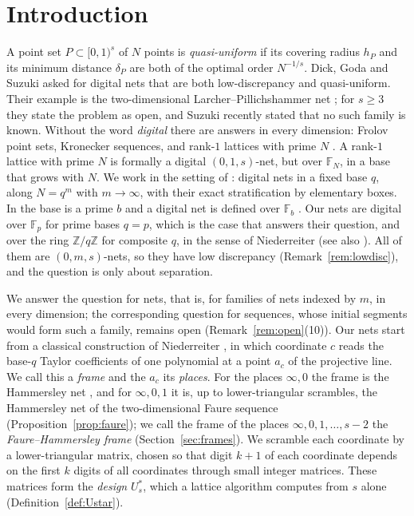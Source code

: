 \documentclass[11pt]{amsart}
\theoremstyle{definition}
\theoremstyle{plain}
\newcommand{\Z}{\mathbb{Z}}
\newcommand{\F}{\mathbb{F}}
\begin{document}
\maketitle
\enlargethispage{6pt}

\section{Introduction}\label{sec:intro}
A point set $P\subset[0,1)^s$ of $N$ points is \emph{quasi-uniform} if its covering radius $h_P$ and its minimum distance $\delta_P$ are both of the optimal order $N^{-1/s}$. Dick, Goda and Suzuki \cite{DGS2} asked for digital nets that are both low-discrepancy and quasi-uniform. Their example is the two-dimensional Larcher--Pillichshammer net \cite{LP01}; for $s\ge3$ they state the problem as open, and Suzuki \cite{Suz26} recently stated that no such family is known. Without the word \emph{digital} there are answers in every dimension: Frolov point sets, Kronecker sequences, and rank-$1$ lattices with prime $N$ \cite[Thms.~3.1, 3.9, 3.7]{DGLPS1}. A rank-$1$ lattice with prime $N$ is formally a digital $(0,1,s)$-net, but over $\F_N$, in a base that grows with $N$. We work in the setting of \cite{DGS2,Suz26}: digital nets in a fixed base $q$, along $N=q^m$ with $m\to\infty$, with their exact stratification by elementary boxes. In \cite{DGS2} the base is a prime $b$ and a digital net is defined over $\F_b$ \cite[Def.~2.1]{DGS2}. Our nets are digital over $\F_p$ for prime bases $q=p$, which is the case that answers their question, and over the ring $\Z/q\Z$ for composite $q$, in the sense of Niederreiter \cite{Nie87} (see also \cite{LNS96}). All of them are $(0,m,s)$-nets, so they have low discrepancy (Remark~\ref{rem:lowdisc}), and the question is only about separation.

We answer the question for nets, that is, for families of nets indexed by $m$, in every dimension; the corresponding question for sequences, whose initial segments would form such a family, remains open (Remark~\ref{rem:open}(10)). Our nets start from a classical construction of Niederreiter \cite[Sec.~6]{Nie87}, in which coordinate $c$ reads the base-$q$ Taylor coefficients of one polynomial at a point $a_c$ of the projective line. We call this a \emph{frame} and the $a_c$ its \emph{places}. For the places $\infty,0$ the frame is the Hammersley net \cite{Ham60}, and for $\infty,0,1$ it is, up to lower-triangular scrambles, the Hammersley net of the two-dimensional Faure sequence \cite{Fau82} (Proposition~\ref{prop:faure}); we call the frame of the places $\infty,0,1,\dots,s-2$ the \emph{Faure--Hammersley frame} (Section~\ref{sec:frames}). We scramble each coordinate by a lower-triangular matrix, chosen so that digit $k+1$ of each coordinate depends on the first $k$ digits of all coordinates through small integer matrices. These matrices form the \emph{design} $U^*_s$, which a lattice algorithm computes from $s$ alone (Definition~\ref{def:Ustar}).
\end{document}
